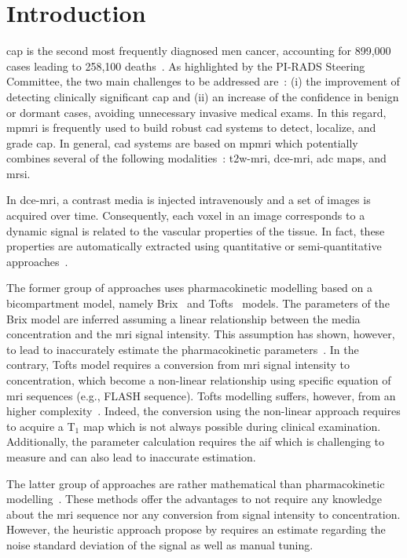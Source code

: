 \section{Introduction}

\Ac{cap} is the second most frequently diagnosed men cancer, accounting for 899,000 cases leading to 258,100 deaths~\citep{ferlay2010estimates}.
As highlighted by the PI-RADS Steering Committee, the two main challenges to be addressed are~\citep{weinreb2016pi}:
(i) the improvement of detecting clinically significant \ac{cap} and
(ii) an increase of the confidence in benign or dormant cases, avoiding unnecessary invasive medical exams.
In this regard, \ac{mpmri} is frequently used to build robust \ac{cad} systems to detect, localize, and grade \ac{cap}.
In general, \ac{cad} systems are based on \ac{mpmri} which potentially combines several of the following modalities~\citep{lemaitre2015computer}: \ac{t2w}-\ac{mri}, \ac{dce}-\ac{mri}, \ac{adc} maps, and \ac{mrsi}.

In \ac{dce}-\ac{mri}, a contrast media is injected intravenously and a set of images is acquired over time.
Consequently, each voxel in an image corresponds to a dynamic signal is related to the vascular properties of the tissue.
In fact, these properties are automatically extracted using quantitative or semi-quantitative approaches~\citep{lemaitre2015computer}.

The former group of approaches uses pharmacokinetic modelling based on a bicompartment model, namely Brix~\citep{brix1991pharmacokinetic} and Tofts~\citep{tofts1995quantitative} models.
The parameters of the Brix model are inferred assuming a linear relationship between the media concentration and the \ac{mri} signal intensity.
This assumption has shown, however, to lead to inaccurately estimate the pharmacokinetic parameters~\citep{heilmann2006determination}.
In the contrary, Tofts model requires a conversion from \ac{mri} signal intensity to concentration, which become a non-linear relationship using specific equation of \ac{mri} sequences (e.g., FLASH sequence).
Tofts modelling suffers, however, from an higher complexity~\citep{gliozzi2011phenomenological}.
Indeed, the conversion using the non-linear approach requires to acquire a T$_1$ map which is not always possible during clinical examination.
Additionally, the parameter calculation requires the \ac{aif} which is challenging to measure and can also lead to inaccurate estimation.

The latter group of approaches are rather mathematical than pharmacokinetic modelling~\citep{huisman2001accurate,gliozzi2011phenomenological}.
These methods offer the advantages to not require any knowledge about the \ac{mri} sequence nor any conversion from signal intensity to concentration.
However, the heuristic approach propose by \citeauthor{huisman2001accurate} requires an estimate regarding the noise standard deviation of the signal as well as manual tuning.


